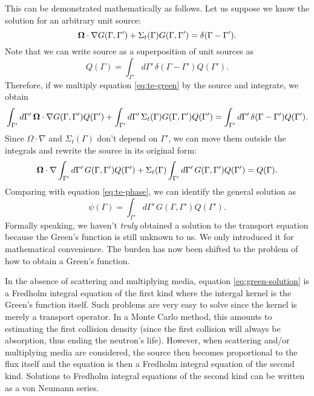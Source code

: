 This can be demonstrated mathematically as follows. Let us suppose we
know the solution for an arbitrary unit source:
\begin{equation}
  \mathbf{\Omega} \cdot \nabla G (\Gamma,\Gamma') + \Sigma_t(\Gamma) G
  (\Gamma,\Gamma') = \delta (\Gamma - \Gamma').
  \label{eq:te-green}
\end{equation}
Note that we can write source as a superposition of unit sources as
\begin{equation}
  Q(\Gamma) = \int_{\Gamma'} d\Gamma' \, \delta(\Gamma - \Gamma')
  Q(\Gamma').
\end{equation}
Therefore, if we multiply equation \ref{eq:te-green} by the source and
integrate, we obtain
\begin{equation}
  \int_{\Gamma'} d\Gamma' \, \mathbf{\Omega} \cdot \nabla G (\Gamma,\Gamma')
  Q(\Gamma') + \int_{\Gamma'} d\Gamma' \, \Sigma_t(\Gamma) G
  (\Gamma,\Gamma') Q(\Gamma') = \int_{\Gamma'} d\Gamma' \,
  \delta(\Gamma - \Gamma') Q(\Gamma').
\end{equation}
Since $\Omega \cdot \nabla$ and $\Sigma_t(\Gamma)$ don't depend on
$\Gamma'$, we can move them outside the integrals and rewrite the
source in its original form:
\begin{equation}
   \mathbf{\Omega} \cdot \nabla \int_{\Gamma'} d\Gamma' \, G (\Gamma,\Gamma')
   Q(\Gamma') + \Sigma_t(\Gamma) \int_{\Gamma'} d\Gamma' \, G
   (\Gamma,\Gamma') Q(\Gamma') = Q(\Gamma).
\end{equation}
Comparing with equation \ref{eq:te-phase}, we can identify the general
solution as
\begin{equation}
  \psi(\Gamma) = \int_{\Gamma'} d\Gamma' \, G (\Gamma,\Gamma') Q(\Gamma').
  \label{eq:green-solution}
\end{equation}
Formally speaking, we haven't {\em truly} obtained a solution to the
transport equation because the Green's function is still unknown to
us. We only introduced it for mathematical convenience. The burden has
now been shifted to the problem of how to obtain a Green's function.

In the absence of scattering and multiplying media, equation
\ref{eq:green-solution} is a Fredholm integral equation of the first
kind where the intergal kernel is the Green's function itself. Such
problems are very easy to solve since the kernel is merely a transport
operator. In a Monte Carlo method, this amounts to estimating the
first collision density (since the first collision will always be
absorption, thus ending the neutron's life). However, when scattering
and/or multiplying media are considered, the source then becomes
proportional to the flux itself and the equation is then a Fredholm
integral equation of the second kind. Solutions to Fredholm integral
equations of the second kind can be written as a von Neumann series.


